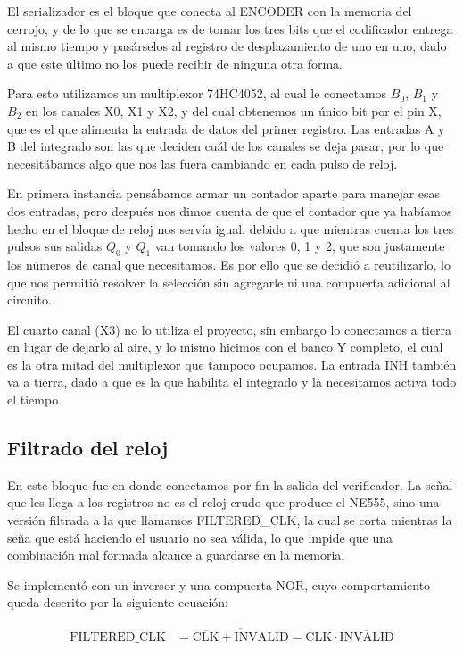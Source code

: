 \documentclass[12pt]{article}
\begin{document}
El serializador es el bloque que conecta al ENCODER con la memoria del cerrojo, y
de lo que se encarga es de tomar los tres bits que el codificador entrega al mismo
tiempo y pasárselos al registro de desplazamiento de uno en uno, dado a que este
último no los puede recibir de ninguna otra forma.

Para esto utilizamos un multiplexor 74HC4052, al cual le conectamos $B_0$, $B_1$ y
$B_2$ en los canales X0, X1 y X2, y del cual obtenemos un único bit por el pin X,
que es el que alimenta la entrada de datos del primer registro. Las entradas A y B
del integrado son las que deciden cuál de los canales se deja pasar, por lo que
necesitábamos algo que nos las fuera cambiando en cada pulso de reloj.

En primera instancia pensábamos armar un contador aparte para manejar esas dos
entradas, pero después nos dimos cuenta de que el contador que ya habíamos hecho
en el bloque de reloj nos servía igual, debido a que mientras cuenta los tres
pulsos sus salidas $Q_0$ y $Q_1$ van tomando los valores 0, 1 y 2, que son
justamente los números de canal que necesitamos. Es por ello que se decidió a
reutilizarlo, lo que nos permitió resolver la selección sin agregarle ni una
compuerta adicional al circuito.

El cuarto canal (X3) no lo utiliza el proyecto, sin embargo lo conectamos a tierra
en lugar de dejarlo al aire, y lo mismo hicimos con el banco Y completo, el cual es
la otra mitad del multiplexor que tampoco ocupamos. La entrada INH también va a
tierra, dado a que es la que habilita el integrado y la necesitamos activa todo el
tiempo.

\subsection{Filtrado del reloj}

En este bloque fue en donde conectamos por fin la salida del verificador. La señal
que les llega a los registros no es el reloj crudo que produce el NE555, sino una
versión filtrada a la que llamamos FILTERED\_CLK, la cual se corta mientras la
seña que está haciendo el usuario no sea válida, lo que impide que una combinación
mal formada alcance a guardarse en la memoria.

Se implementó con un inversor y una compuerta NOR, cuyo comportamiento queda
descrito por la siguiente ecuación:

\begin{align*}
\text{FILTERED\_CLK} &= \overline{\overline{\text{CLK}} + \text{INVALID}}
= \text{CLK} \cdot \overline{\text{INVALID}}
\end{align*}
\end{document}
